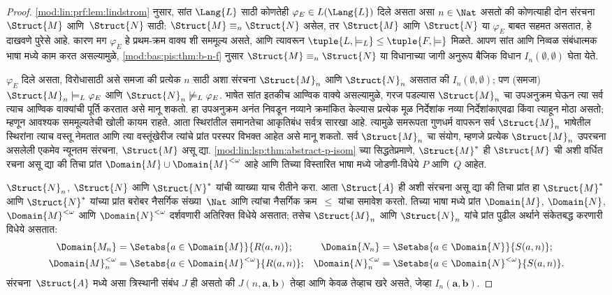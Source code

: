 \begin{proof}
\ref{mod:lin:prf:lem:lindstrom} नुसार, सांत $\Lang{L}$ साठी कोणतेही $\varphi_{E}
\in L(\Lang{L})$ दिले असता असा $n \in \Nat$ असतो की कोणत्याही दोन
संरचना $\Struct{M}$ आणि~$\Struct{N}$ साठी: $\Struct{M}
\equiv_n \Struct{N}$ असेल, तर $\Struct{M}$ आणि $\Struct{N}$ या $\varphi_{E}$
बाबत सहमत असतात, हे दाखवणे पुरेसे आहे. कारण मग $\varphi_{E}$ हे प्रथम-क्रम
वाक्य शी सममूल्य असते, आणि त्यावरून $\tuple{L, \models_L} \le
\tuple{F, \models}$ मिळते. आपण सांत आणि निव्वळ संबंधात्मक
भाषा मध्ये काम करत असल्यामुळे, \ref{mod:bas:pis:thm:b-n-f}
नुसार $\Struct{M} \equiv_n \Struct{N}$ या विधानाच्या जागी अनुरूप बैजिक
विधान $I_n(\emptyset,\emptyset)$ घेता येते.

$\varphi_{E}$ दिले असता, विरोधासाठी असे समजा की प्रत्येक $n$ साठी अशा
संरचना $\Struct{M}_n$ आणि $\Struct{N}_n$ असतात की
$I_n(\emptyset, \emptyset)$; पण (समजा) $\Struct{M}_n \models_L \varphi_{E}$
आणि $\Struct{N}_n \not\models_L \varphi_{E}$. भाषेत सांत इतकीच आण्विक
वाक्ये असल्यामुळे, गरज पडल्यास $\Struct{M}_n$ चा उपअनुक्रम
घेऊन त्या सर्व त्याच आण्विक वाक्यांची पूर्ति करतात असे मानू
शकतो. हा उपअनुक्रम अनंत निवडून नव्याने क्रमांकित केल्यास प्रत्येक मूळ
निर्देशांक नव्या निर्देशांकाएवढा किंवा त्याहून मोठा असतो; म्हणून आवश्यक
सममूल्यतेची खोली कायम राहते. आता स्थिरांतील समानतेचा आकृतिबंध सर्वत्र
सारखा आहे. त्यामुळे समरूपता गुणधर्म वापरून सर्व $\Struct{M}_n$ भाषेतील
स्थिरांना त्याच वस्तू नेमतात आणि त्या वस्तूंखेरीज त्यांचे प्रांत परस्पर
विभक्त आहेत असे मानू शकतो. सर्व $\Struct{M}_n$ चा संयोग,
म्हणजे प्रत्येक $\Struct{M}_n$ उपरचना असलेली एकमेव न्यूनतम
संरचना, $\Struct{M}$ असू द्या. \ref{mod:lin:lsp:thm:abstract-p-isom}
च्या सिद्धतेप्रमाणे, $\Struct{M}^*$ ही $\Struct{M}$ ची अशी वर्धित रचना
असू द्या की तिचा प्रांत $\Domain{M} \cup
\Domain{M}^{<\omega}$ आहे आणि तिच्या विस्तारित भाषा मध्ये
जोडणी-विधेये $P$ आणि~$Q$ आहेत.




$\Struct{N}_n$, $\Struct{N}$ आणि $\Struct{N}^*$ यांची व्याख्या याच
रीतीने करा. आता $\Struct{A}$ ही अशी संरचना असू द्या की तिचा
प्रांत हा $\Struct{M}^*$ आणि $\Struct{N}^*$ यांच्या प्रांत
बरोबर नैसर्गिक संख्या~$\Nat$ आणि त्यांचा नैसर्गिक क्रम~$\le$ यांचा
समावेश करतो. तिच्या भाषा मध्ये प्रांत $\Domain{M}$,
$\Domain{N}$, $\Domain{M}^{<\omega}$ आणि $\Domain{N}^{<\omega}$
दर्शवणारी अतिरिक्त विधेये असतात; तसेच $\Struct{M}_n$ आणि
$\Struct{N}_n$ यांचे प्रांत पुढील अर्थाने संकेतबद्ध करणारी विधेये असतात:
\begin{align*}
  \Domain{M_n} & = \Setabs{a \in \Domain{M}}{R(a, n)}; &
  \Domain{N_n} & = \Setabs{a \in \Domain{N}}{S(a,n)}; \\
  \Domain{M}^{<\omega}_n & = \Setabs{a \in \Domain{M}^{<\omega}}{R(a,n)}; &
  \Domain{N}^{<\omega}_n & = \Setabs{a \in \Domain{N}^{<\omega}}{S(a,n)}.
\end{align*}
संरचना~$\Struct{A}$ मध्ये असा त्रिस्थानी संबंध $J$ ही असतो की
$J(n, \mathbf{a}, \mathbf{b})$ तेव्हा आणि केवळ तेव्हाच खरे असते,
जेव्हा $I_n(\mathbf{a}, \mathbf{b})$.



\end{proof}
